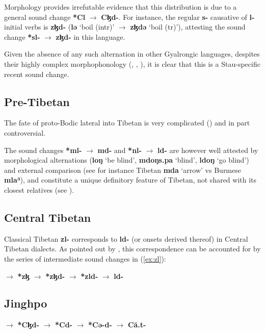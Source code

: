 \documentclass[oneside,a4paper,11pt]{article}
\newcommand{\ipa}[1]{{\phon\textbf{#1}}}
\begin{document}
Morphology provides irrefutable evidence that this distribution is due to a general sound change \ipa{*Cl} $\rightarrow$ \ipa{Cɮd-}. For instance, the regular \ipa{s-} causative of \ipa{l-} initial verbs is \ipa{zɮd-} (\ipa{lə} `boil (intr)' $\rightarrow$ \ipa{zɮdə} `boil (tr)'), attesting the sound change \ipa{*sl-} $\rightarrow$ \ipa{zɮd-} in this language.

Given the absence of any such alternation in other Gyalrongic languages, despites their highly complex morphophonology (\citealt{jackson07shangzhai}, \citealt{jacques15causative}, \citealt{lai16caus}), it is clear that this is a Stau-specific recent sound change.

\subsection{Pre-Tibetan}
The fate of proto-Bodic lateral into Tibetan is very complicated (\citealt{hill11laws, hill13laterals}) and in part controversial. 

The sound changes \ipa{*ml-} $\rightarrow$ \ipa{md-} and \ipa{*nl-} $\rightarrow$ \ipa{ld-} are however well attested by morphological alternations (\ipa{loŋ} `be blind', \ipa{mdoŋs.pa} `blind', \ipa{ldoŋ} `go blind') and external comparison (see for instance Tibetan \ipa{mda} `arrow' vs Burmese \ipa{mla³}), and constitute a unique definitory feature of Tibetan, not shared with its closest relatives (see \citealt{jacques04thimphu}).

\subsection{Central Tibetan}
Classical Tibetan \ipa{zl-} corresponds to \ipa{ld-} (or onsets derived thereof) in Central Tibetan dialects. As pointed out by \citet{gong16ld}, this correspondence can be accounted for by the series of intermediate sound changes in (\ref{ex:zl}):

\begin{exe}
\ex \label{ex:zl}
\glt \ipa{zl-} $\rightarrow$ \ipa{*zɮ} $\rightarrow$ \ipa{*zɮd-} $\rightarrow$ \ipa{*zld-} $\rightarrow$ \ipa{ld-}
\end{exe}

\subsection{Jinghpo} \label{sec:jinghpo.Cl}

\begin{exe}
\ex \label{ex:Cl}
\glt \ipa{*Cl-} $\rightarrow$ \ipa{*Cɮd-} $\rightarrow$ \ipa{*Cd-} $\rightarrow$ \ipa{*Cə-d-} $\rightarrow$ \ipa{Că.t-}
\end{exe}
\end{document}
